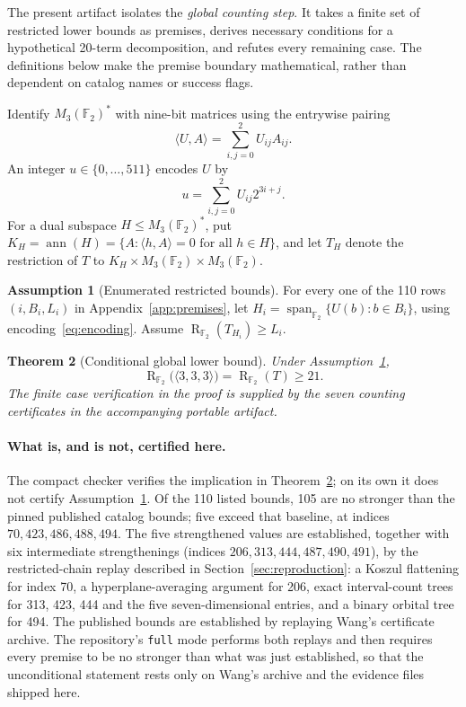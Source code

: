 \documentclass[11pt]{article}
\newcommand{\F}{\mathbb F_2}
\newcommand{\V}{M_3(\F)}
\newcommand{\R}{\operatorname{R}_{\F}}
\newcommand{\Ann}{\operatorname{ann}}
\newtheorem{theorem}{Theorem}
\theoremstyle{definition}
\newtheorem{assumption}[theorem]{Assumption}
\begin{document}
The present artifact isolates the \emph{global counting step}. It takes a finite set of restricted lower bounds as premises, derives necessary conditions for a hypothetical 20-term decomposition, and refutes every remaining case. The definitions below make the premise boundary mathematical, rather than dependent on catalog names or success flags.

Identify $\V^*$ with nine-bit matrices using the entrywise pairing
\[
 \langle U,A\rangle=\sum_{i,j=0}^{2} U_{ij}A_{ij}.
\]
An integer $u\in\{0,\dots,511\}$ encodes $U$ by
\begin{equation}\label{eq:encoding}
 u=\sum_{i,j=0}^{2} U_{ij}2^{3i+j}.
\end{equation}
For a dual subspace $H\leq\V^*$, put
$K_H=\Ann(H)=\{A:\langle h,A\rangle=0\text{ for all }h\in H\}$,
and let $T_H$ denote the restriction of $T$ to $K_H\times\V\times\V$.

\begin{assumption}[Enumerated restricted bounds]\label{ass:premises}
For every one of the 110 rows $(i,B_i,L_i)$ in Appendix~\ref{app:premises},
let $H_i=\operatorname{span}_{\F}\{U(b):b\in B_i\}$, using encoding~\eqref{eq:encoding}.
Assume $\R(T_{H_i})\geq L_i$.
\end{assumption}

\begin{theorem}[Conditional global lower bound]\label{thm:main}
Under Assumption~\ref{ass:premises},
\[
 \R\bigl(\langle3,3,3\rangle\bigr)=\R(T)\geq21.
\]
The finite case verification in the proof is supplied by the seven counting certificates in the accompanying portable artifact.
\end{theorem}

\paragraph{What is, and is not, certified here.}
The compact checker verifies the implication in Theorem~\ref{thm:main}; on its own it does not certify Assumption~\ref{ass:premises}. Of the 110 listed bounds, 105 are no stronger than the pinned published catalog bounds; five exceed that baseline, at indices $70,423,486,488,494$. The five strengthened values are established, together with six intermediate strengthenings (indices $206,313,444,487,490,491$), by the restricted-chain replay described in Section~\ref{sec:reproduction}: a Koszul flattening for index 70, a hyperplane-averaging argument for 206, exact interval-count trees for 313, 423, 444 and the five seven-dimensional entries, and a binary orbital tree for 494. The published bounds are established by replaying Wang's certificate archive. The repository's \texttt{full} mode performs both replays and then requires every premise to be no stronger than what was just established, so that the unconditional statement rests only on Wang's archive and the evidence files shipped here.
\end{document}
